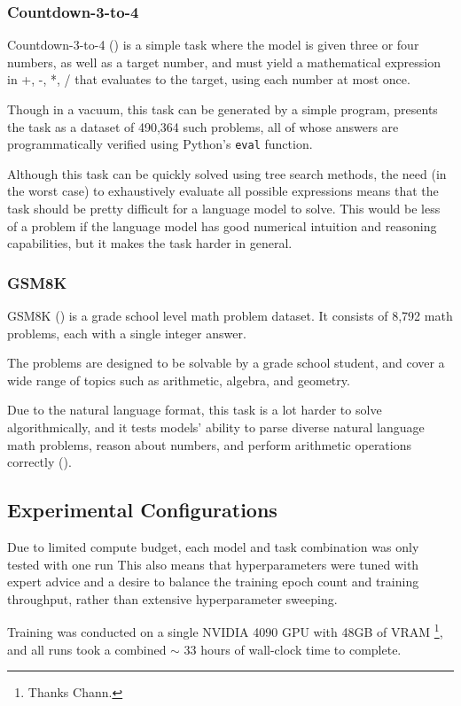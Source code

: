\documentclass{article} %
\theoremstyle{definition}
\begin{document}
\subsubsection{Countdown-3-to-4}
Countdown-3-to-4 (\cite{countdown}) is a simple task where the model is given three or four numbers, as well as a target number,
and must yield a mathematical expression in +, -, *, / that evaluates to the target, using each number at most once.

Though in a vacuum, this task can be generated by a simple program,
\cite{countdown} presents the task as a dataset of 490,364 such problems, all of whose answers
are programmatically verified using Python's \texttt{eval} function.

Although this task can be quickly solved using tree search methods,
the need (in the worst case) to exhaustively evaluate all possible expressions
means that the task should be pretty difficult for a language model to solve.
This would be less of a problem if the language model has good numerical intuition
and reasoning capabilities, but it makes the task harder in general.

\subsubsection{GSM8K}
GSM8K (\cite{gsm8k}) is a grade school level math problem dataset.
It consists of 8,792 math problems, each with a single integer answer.

The problems are designed to be solvable by a grade school student, 
and cover a wide range of topics such as arithmetic, algebra, and geometry.

Due to the natural language format, this task is a lot harder to solve algorithmically, and it tests models' ability to parse 
diverse natural language math problems, reason about numbers, and perform arithmetic operations correctly (\cite{gsm8k}).

\subsection{Experimental Configurations}

Due to limited compute budget, each model and task combination was only tested with one run
This also means that hyperparameters were tuned with expert advice and
a desire to balance the training epoch count and training throughput, 
rather than extensive hyperparameter sweeping.

Training was conducted on a single NVIDIA 4090 GPU with 48GB of VRAM \footnote{
    Thanks Chann.
}, and all runs took a combined $\sim$ 33 hours of wall-clock time to complete.
\end{document}
